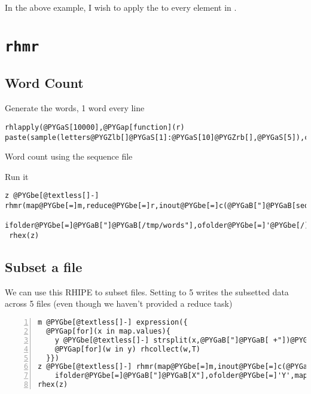 \documentclass[letterpaper,10pt,english]{manual}
\begin{document}
In the above example, I wish to apply the  to every element in .


\section{\texttt{rhmr}}


\subsection{Word Count}

Generate the words, 1 word every line

\begin{Verbatim}[commandchars=@\[\]]
rhlapply(@PYGaS[10000],@PYGap[function](r) paste(sample(letters@PYGZlb[]@PYGaS[1]:@PYGaS[10]@PYGZrb[],@PYGaS[5]),collapse@PYGbe[=]@PYGaB["]@PYGaB["]),output.folder@PYGbe[=]'@PYGbe[/]tmp@PYGbe[/]words')
\end{Verbatim}

Word count using the sequence file

Run it

\begin{Verbatim}[commandchars=@\[\]]
z @PYGbe[@textless[]-] rhmr(map@PYGbe[=]m,reduce@PYGbe[=]r,inout@PYGbe[=]c(@PYGaB["]@PYGaB[sequence"],@PYGaB["]@PYGaB[sequence"]),
       ifolder@PYGbe[=]@PYGaB["]@PYGaB[/tmp/words"],ofolder@PYGbe[=]'@PYGbe[/]tmp@PYGbe[/]wordcount')
 rhex(z)
\end{Verbatim}


\subsection{Subset a file}

We can use this RHIPE to subset files. Setting  to 5 writes the subsetted data across 5 files (even though we haven't provided a reduce task)

\begin{Verbatim}[commandchars=@\[\],numbers=left,firstnumber=1,stepnumber=1]
m @PYGbe[@textless[]-] expression({
  @PYGap[for](x in map.values){
    y @PYGbe[@textless[]-] strsplit(x,@PYGaB["]@PYGaB[ +"])@PYGZlb[]@PYGZlb[]@PYGaS[1]@PYGZrb[]@PYGZrb[]
    @PYGap[for](w in y) rhcollect(w,T)
  }})
z @PYGbe[@textless[]-] rhmr(map@PYGbe[=]m,inout@PYGbe[=]c(@PYGaB["]@PYGaB[text"],@PYGaB["]@PYGaB[binary"]),
    ifolder@PYGbe[=]@PYGaB["]@PYGaB[X"],ofolder@PYGbe[=]'Y',mapred@PYGbe[=]list(mapred.reduce.tasks@PYGbe[=]@PYGaS[5]))
rhex(z)
\end{Verbatim}
\end{document}
